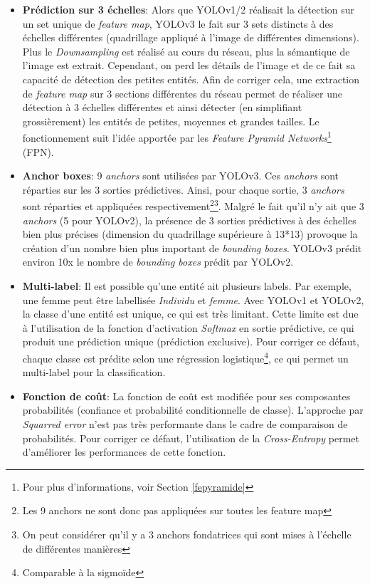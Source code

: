 \begin{itemize}
    \item \textbf{Prédiction sur 3 échelles}: Alors que YOLOv1/2 réalisait la détection sur un set unique de \textit{feature map}, YOLOv3 le fait sur 3 sets distincts à des échelles différentes (quadrillage appliqué à l'image de différentes dimensions). Plus le \textit{Downsampling} est réalisé au cours du réseau, plus la sémantique de l'image est extrait. Cependant, on perd les détails de l'image et de ce fait sa capacité de détection des petites entités. Afin de corriger cela, une extraction de \textit{feature map} sur 3 sections différentes du réseau permet de réaliser une détection à 3 échelles différentes et ainsi détecter (en simplifiant grossièrement) les entités de petites, moyennes et grandes tailles. Le fonctionnement suit l'idée apportée par les \textit{Feature Pyramid Networks}\footnote{Pour plus d'informations, voir Section \ref{fepyramide}} (FPN).\\

    \item \textbf{Anchor boxes}: 9 \textit{anchors} sont utilisées par YOLOv3. Ces \textit{anchors} sont réparties sur les 3 sorties prédictives. Ainsi, pour chaque sortie, 3 \textit{anchors} sont réparties et appliquées respectivement\footnote{Les 9 anchors ne sont donc pas appliquées sur toutes les feature map}\footnote{On peut considérer qu'il y a 3 anchors fondatrices qui sont mises à l'échelle de différentes manières}. Malgré le fait qu'il n'y ait que 3 \textit{anchors} (5 pour YOLOv2), la présence de 3 sorties prédictives à des échelles bien plus précises (dimension du quadrillage supérieure à 13*13) provoque la création d'un nombre bien plus important de \textit{bounding boxes}. YOLOv3 prédit environ 10x le nombre de \textit{bounding boxes} prédit par YOLOv2.

    \item \textbf{Multi-label}: Il est possible qu'une entité ait plusieurs labels. Par exemple, une femme peut être labellisée \textit{Individu} et \textit{femme}. Avec YOLOv1 et YOLOv2, la classe d'une entité est unique, ce qui est très limitant. Cette limite est due à l'utilisation de la fonction d'activation \textit{Softmax} en sortie prédictive, ce qui produit une prédiction unique (prédiction exclusive). Pour corriger ce défaut, chaque classe est prédite selon une régression logistique\footnote{Comparable à la sigmoïde}, ce qui permet un multi-label pour la classification.

    \item \textbf{Fonction de coût}: La fonction de coût est modifiée pour ses composantes probabilités (confiance et probabilité conditionnelle de classe). L'approche par \textit{Squarred error} n'est pas très performante dans le cadre de comparaison de probabilités. Pour corriger ce défaut, l'utilisation de la \textit{Cross-Entropy} permet d'améliorer les performances de cette fonction.
\end{itemize}

